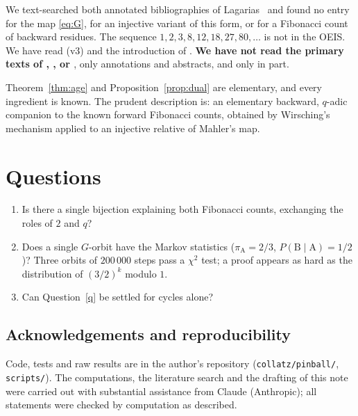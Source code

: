 \documentclass[11pt]{article}
\begin{document}
We text-searched both annotated bibliographies of Lagarias~\cite{La1,La2} and found no entry for the map
\eqref{eq:G}, for an injective variant of this form, or for a Fibonacci count of backward residues. The sequence
$1,2,3,8,12,18,27,80,\dots$ is not in the OEIS. We have read \cite{Wk} (v3) and the introduction of
\cite{FK}. \textbf{We have not read the primary texts of \cite{Wi}, \cite{MS}, \cite{Ba} or \cite{Ge}}, only
annotations and abstracts, and \cite{RJ} only in part.

Theorem~\ref{thm:age} and Proposition~\ref{prop:dual} are elementary, and every ingredient is known. The prudent
description is: an elementary backward, $q$-adic companion to the known forward Fibonacci counts, obtained by
Wirsching's mechanism applied to an injective relative of Mahler's map.

\section{Questions}
\begin{enumerate}
\item Is there a single bijection explaining both Fibonacci counts, exchanging the roles of $2$ and $q$?
\item Does a single $G$-orbit have the Markov statistics ($\pi_{\mathrm A}=2/3$, $P(\mathrm B\mid\mathrm A)=1/2$)?
Three orbits of $200\,000$ steps pass a $\chi^{2}$ test; a proof appears as hard as the distribution of
$(3/2)^{k}$ modulo $1$.
\item Can Question~\ref{q} be settled for cycles alone?
\end{enumerate}

\subsection*{Acknowledgements and reproducibility}
Code, tests and raw results are in the author's repository (\texttt{collatz/pinball/}, \texttt{scripts/}). The
computations, the literature search and the drafting of this note were carried out with substantial assistance
from Claude (Anthropic); all statements were checked by computation as described.
\end{document}
